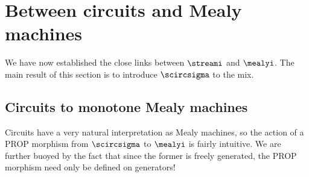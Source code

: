 \section{Between circuits and Mealy machines}

We have now established the close links between \(\streami\) and \(\mealyi\).
The main result of this section is to introduce \(\scircsigma\) to the mix.

\subsection{Circuits to monotone Mealy machines}

Circuits have a very natural interpretation as Mealy machines, so the action
of a PROP morphism from \(\scircsigma\) to \(\mealyi\) is fairly intuitive.
We are further buoyed by the fact that since the former is freely generated, the
PROP morphism need only be defined on generators!

